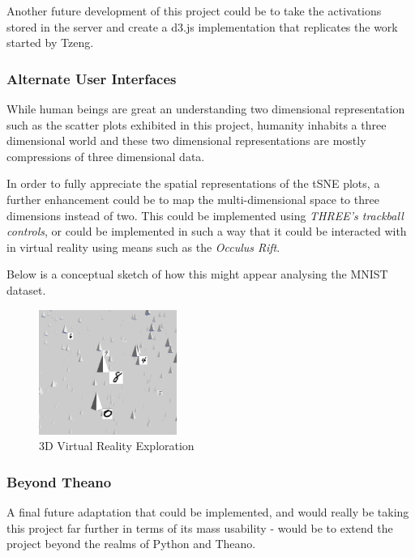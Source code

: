 \documentclass[a4paper,11pt,titlepage]{article}
\begin{document}
	Another future development of this project could be to take the activations stored in the server and create a d3.js implementation that replicates the work started by Tzeng.
	
	\subsubsection{Alternate User Interfaces}	
	While human beings are great an understanding two dimensional representation such as the scatter plots exhibited in this project, humanity inhabits a three dimensional world and these two dimensional representations are mostly compressions of three dimensional data.
	\par 
	In order to fully appreciate the spatial representations of the tSNE plots, a further enhancement could be to map the multi-dimensional space to three dimensions instead of two. This could be implemented using \textit{THREE's trackball controls}, or could be implemented in such a way that it could be interacted with in virtual reality using means such as the \textit{Occulus Rift}.
	\par 
	Below is a conceptual sketch of how this might appear analysing the MNIST dataset.
		
	\begin{figure}[H]
		\centering 
    		\includegraphics[width=0.4\textwidth]{img/occulus_rift.png} 
    		\caption{3D Virtual Reality Exploration}%
 	\end{figure}
		
	\subsubsection{Beyond Theano}
	A final future adaptation that could be implemented, and would really be taking this project far further in terms of its mass usability - would be to extend the project beyond the realms of Python and Theano. 
	
\end{document}
